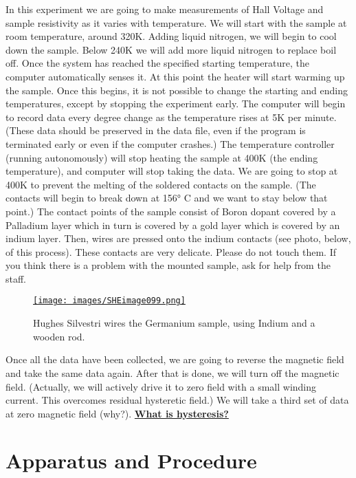 \documentclass{../lab}
\begin{document}
In this experiment we are going to make measurements of Hall Voltage and sample resistivity as it varies with temperature. We will start with the sample at room temperature, around 320K. Adding liquid nitrogen, we will begin to cool down the sample. Below 240K we will add more liquid nitrogen to replace boil off. Once the system has reached the specified starting temperature, the computer automatically senses it. At this point the heater will start warming up the sample. Once this begins, it is not possible to change the starting and ending temperatures, except by stopping the experiment early. The computer will begin to record data every degree change as the temperature rises at 5K per minute. (These data should be preserved in the data file, even if the program is terminated early or even if the computer crashes.) The temperature controller (running autonomously) will stop heating the sample at 400K (the ending temperature), and computer will stop taking the data. We are going to stop at 400K to prevent the melting of the soldered contacts on the sample. (The contacts will begin to break down at 156° C and we want to stay below that point.) The contact points of the sample consist of Boron dopant covered by a Palladium layer which in turn is covered by a gold layer which is covered by an indium layer. Then, wires are pressed onto the indium contacts (see photo, below, of this process). These contacts are very delicate. Please do not touch them. If you think there is a problem with the mounted sample, ask for help from the staff.

\begin{figure}[h]
    \centering
    \href{http://experimentationlab.berkeley.edu/sites/default/files/images/SHEimage099.gif}{\texttt{[image: images/SHEimage099.png]}}
    \caption{Hughes Silvestri wires the Germanium sample, using Indium and a wooden rod.}
    \label{fig:SHEimage099}
\end{figure}

Once all the data have been collected, we are going to reverse the magnetic field and take the same data again. After that is done, we will turn off the magnetic field. (Actually, we will actively drive it to zero field with a small winding current. This overcomes residual hysteretic field.) We will take a third set of data at zero magnetic field (why?). \href{http://experimentationlab.berkeley.edu/hysteresis}{\textbf{What is hysteresis?}}

\section{Apparatus and Procedure}
\end{document}
